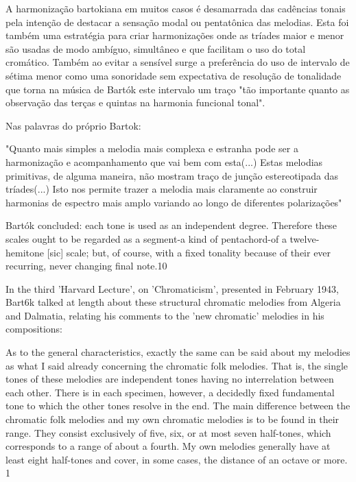 \documentclass[
	12pt,				%
	openright,			%
	twoside,			%
	a4paper,			%
	english,			%
	french,				%
	spanish,			%
	brazil				%
	]{abntex2}
\begin{document}
A harmonização  bartokiana em muitos casos é desamarrada das cadências tonais pela intenção de destacar a sensação modal ou pentatônica das melodias. Esta foi também uma estratégia para criar harmonizações onde as tríades maior e menor são usadas de modo ambíguo, simultâneo e que facilitam o uso do total cromático. Também ao evitar a sensível surge a preferência do uso de intervalo de sétima menor como uma sonoridade sem expectativa de resolução de tonalidade que torna na música de Bartók este intervalo um traço "tão importante quanto as observação das terças e quintas na harmonia funcional tonal"\cite[p. 28]{antokoletz1984music}.

Nas palavras do próprio Bartok:

\begin{citacao}
"Quanto mais simples a melodia mais complexa e estranha pode ser a harmonização e acompanhamento que vai bem com esta(...) Estas melodias primitivas, de alguma maneira, não mostram traço de junção estereotipada das tríades(...) Isto nos permite trazer a melodia mais claramente ao construir harmonias de espectro mais amplo variando ao longo de diferentes polarizações"
\cite[p. 342]{bartok1993bela}
\end{citacao}


Bartók concluded:
each tone is used as an independent degree. Therefore these scales ought to be regarded as a segment-a kind of
pentachord-of a twelve-hemitone [sic] scale; but, of course, with a fixed tonality because of their ever
recurring, never changing final note.10

In the third 'Harvard Lecture', on 'Chromaticism', presented in February 1943,
Bart6k talked at length about these structural chromatic melodies from Algeria and
Dalmatia, relating his comments to the 'new chromatic' melodies in his compositions:

As to the general characteristics, exactly the same can be said about my melodies as what I said already
concerning the chromatic folk melodies. That is, the single tones of these melodies are independent tones
having no interrelation between each other. There is in each specimen, however, a decidedly fixed
fundamental tone to which the other tones resolve in the end. The main difference between the chromatic folk
melodies and my own chromatic melodies is to be found in their range. They consist exclusively of five, six, or
at most seven half-tones, which corresponds to a range of about a fourth. My own melodies generally have at
least eight half-tones and cover, in some cases, the distance of an octave or more. 1
\cite[ p.6]{gillies1983bartok}
\end{document}
